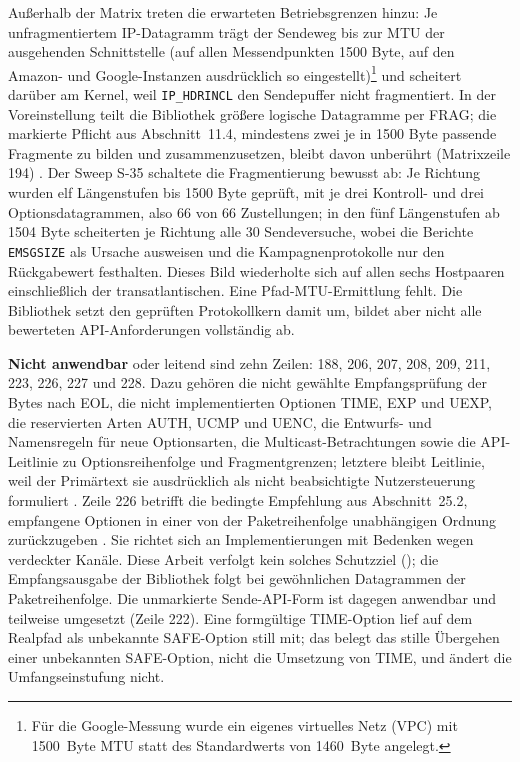 Außerhalb der Matrix treten die erwarteten Betriebsgrenzen hinzu: Je unfragmentiertem IP-Datagramm trägt
der Sendeweg bis zur MTU der ausgehenden Schnittstelle (auf allen Messendpunkten 1500 Byte, auf den
Amazon- und Google-Instanzen ausdrücklich so eingestellt)\footnote{Für die Google-Messung wurde ein eigenes
virtuelles Netz (VPC) mit 1500~Byte MTU statt des Standardwerts von 1460~Byte angelegt.}
und scheitert darüber am Kernel, weil
\texttt{IP\_HDRINCL} den Sendepuffer nicht fragmentiert. In der Voreinstellung teilt die Bibliothek
größere logische Datagramme per FRAG; die markierte Pflicht aus Abschnitt~11.4, mindestens zwei je in
1500 Byte passende Fragmente zu bilden und zusammenzusetzen, bleibt davon unberührt (Matrixzeile 194)
\cite[Sec.~11.4]{rfc9868}. Der Sweep S-35 schaltete die Fragmentierung bewusst ab: Je Richtung wurden elf
Längenstufen bis 1500 Byte geprüft, mit je drei Kontroll- und drei Optionsdatagrammen, also 66 von 66
Zustellungen; in den fünf Längenstufen ab 1504 Byte scheiterten je Richtung alle 30 Sendeversuche, wobei
die Berichte \texttt{EMSGSIZE} als Ursache ausweisen und die Kampagnen\-protokolle nur den Rückgabewert
festhalten. Dieses Bild wiederholte sich auf allen sechs Hostpaaren einschließlich der transatlantischen.
Eine Pfad-MTU-Ermittlung fehlt. Die Bibliothek setzt den
geprüften Protokollkern damit um, bildet aber nicht alle bewerteten API-Anforderungen vollständig ab.

\textbf{Nicht anwendbar} oder leitend sind zehn Zeilen: 188, 206, 207, 208, 209, 211, 223, 226, 227 und 228. Dazu
gehören die nicht gewählte Empfangsprüfung der Bytes nach EOL, die nicht implementierten Optionen TIME, EXP und UEXP,
die reservierten Arten AUTH, UCMP und UENC, die Entwurfs- und Namensregeln für neue Options\-arten, die
Multicast-Betrachtungen sowie die API-Leitlinie zu Optionsreihenfolge und Fragmentgrenzen; letztere bleibt Leitlinie,
weil der Primärtext sie ausdrücklich als nicht beabsichtigte Nutzersteuerung formuliert \cite[Sec.~15]{rfc9868}. Zeile
226 betrifft die bedingte Empfehlung aus Abschnitt~25.2, empfangene Optionen in einer von der Paketreihenfolge
unabhängigen Ordnung zurückzugeben \cite[Sec.~25.2]{rfc9868}. Sie richtet sich an Implementierungen mit Bedenken wegen
verdeckter Kanäle. Diese Arbeit verfolgt kein solches Schutzziel (); die Empfangsausgabe der
Bibliothek folgt bei gewöhnlichen Datagrammen der Paketreihenfolge. Die unmarkierte Sende-API-Form ist dagegen
anwendbar und teilweise umgesetzt (Zeile 222). Eine formgültige TIME-Option lief auf dem Realpfad als unbekannte
SAFE-Option still mit; das belegt das stille Übergehen einer unbekannten SAFE-Option, nicht die Umsetzung von TIME,
und ändert die Umfangseinstufung nicht.

